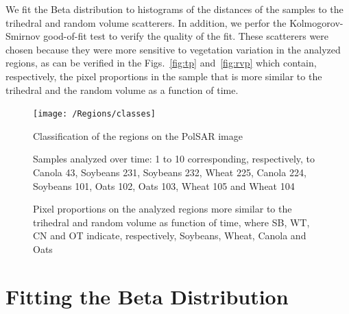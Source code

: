 \documentclass[12pt]{article}
\begin{document}

We fit the Beta distribution to histograms of the distances of the samples to the trihedral and random volume scatterers. 
In addition, we perfor the Kolmogorov-Smirnov good-of-fit test to verify the quality of the fit. 
These scatterers were chosen because they were more sensitive to vegetation variation in the analyzed regions, as can be verified in the Figs.~\ref{fig:tp} and~\ref{fig:rvp} which contain, respectively, the pixel proportions in the sample that is more similar to the trihedral and the random volume as a function of time.

\begin{figure}[hbt]
  \centering
  \texttt{[image: /Regions/classes]}
  \caption{Classification of the regions on the PolSAR image}
  \label{fig:classes}
\end{figure}

\begin{figure}[hbt]
  \centering
  \caption{Samples analyzed over time: 1 to 10 corresponding, respectively, to Canola 43, Soybeans 231, Soybeans 232, Wheat 225, Canola 224, Soybeans 101, Oats 102, Oats 103, Wheat 105 and Wheat 104}
  \label{fig:regions}
\end{figure}

\begin{figure}[ht]
    \centering
    \caption{Pixel proportions on the analyzed regions more similar to the trihedral and random volume as function of time, where SB, WT, CN and OT indicate, respectively, Soybeans, Wheat, Canola and Oats}
    \label{fig:pixel_proportions}
\end{figure}

\section{Fitting the Beta Distribution}
\end{document}
